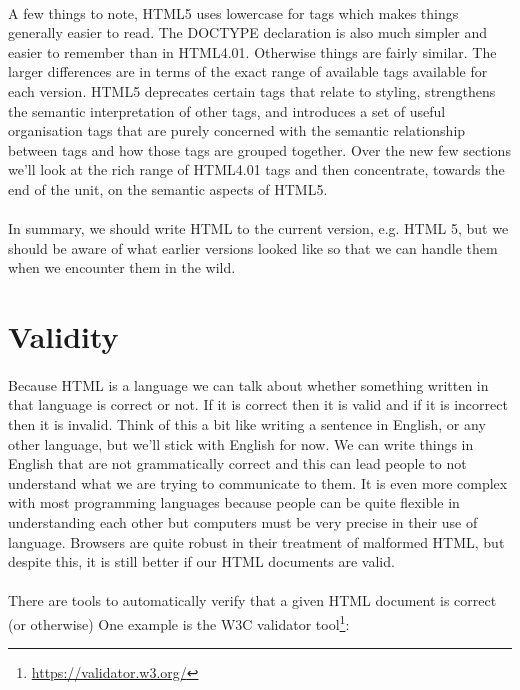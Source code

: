 \paragraph{} A few things to note, HTML5 uses lowercase for tags which makes things generally easier to read. The DOCTYPE declaration is also much simpler and easier to remember than in HTML4.01. Otherwise things are fairly similar. The larger differences are in terms of the exact range of available tags available for each version. HTML5 deprecates certain tags that relate to styling, strengthens the semantic interpretation of other tags, and introduces a set of useful organisation tags that are purely concerned with the semantic relationship between tags and how those tags are grouped together. Over the new few sections we'll look at the rich range of HTML4.01 tags and then concentrate, towards the end of the unit, on the semantic aspects of HTML5.
\paragraph{} In summary, we should write HTML to the current version, e.g. HTML 5, but we should be aware of what earlier versions looked like so that we can handle them when we encounter them in the wild.

\section{Validity}
\paragraph{} Because HTML is a language we can talk about whether something written in that language is correct or not. If it is correct then it is valid and if it is incorrect then it is invalid. Think of this a bit like writing a sentence in English, or any other language, but we'll stick with English for now. We can write things in English that are not grammatically correct and this can lead people to not understand what we are trying to communicate to them. It is even more complex with most programming languages because people can be quite flexible in understanding each other but computers must be very precise in their use of language. Browsers are quite robust in their treatment of malformed HTML, but despite this, it is still better if our HTML documents are valid.
\paragraph{} There are tools to automatically verify that a given HTML document is correct (or otherwise) One example is the W3C validator tool\footnote{\url{https://validator.w3.org/}}:

